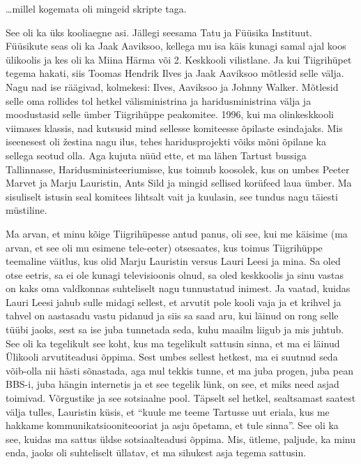 
\ldots millel kogemata oli mingeid skripte taga. 


See oli ka üks kooliaegne asi. Jällegi seesama Tatu ja Füüsika Instituut. Füüsikute seas oli ka Jaak Aaviksoo, kellega mu isa käis kunagi samal ajal koos ülikoolis ja  kes oli ka Miina Härma või 2. Keskkooli vilistlane. Ja kui Tiigrihüpet tegema hakati, siis Toomas Hendrik Ilves ja Jaak Aaviksoo mõtlesid selle välja. Nagu nad ise räägivad, kolmekesi: Ilves, Aaviksoo ja Johnny Walker. Mõtlesid selle oma rollides tol hetkel välisministrina ja haridusministrina välja ja moodustasid selle ümber Tiigrihüppe peakomitee. 1996, kui ma olinkeskkooli viimases klassis, nad kutsusid mind sellesse komiteesse  õpilaste esindajaks. Mis  iseenesest oli žestina nagu  ilus, tehes  haridusprojekti  võiks mõni õpilane ka sellega seotud olla. Aga kujuta nüüd ette, et ma lähen Tartust bussiga Tallinnasse, Haridusministeeriumisse, kus toimub koosolek, kus on umbes Peeter Marvet ja Marju Lauristin, Ants Sild ja mingid sellised korüfeed laua ümber. Ma sisuliselt istusin seal komitees lihtsalt vait ja kuulasin, see tundus nagu täiesti müstiline. 

Ma arvan, et minu kõige Tiigrihüpesse antud panus, oli see, kui me käisime (ma arvan, et see oli mu esimene tele-eeter) otsesaates, kus toimus Tiigrihüppe teemaline väitlus, kus olid Marju Lauristin versus Lauri Leesi ja mina. Sa oled otse eetris, sa ei ole  kunagi televisioonis olnud, sa oled keskkoolis ja sinu vastas on kaks oma valdkonnas suhteliselt nagu tunnustatud inimest. Ja vaatad, kuidas Lauri Leesi jahub sulle midagi sellest, et arvutit pole kooli vaja ja et krihvel ja tahvel on aastasadu vastu pidanud ja siis sa saad aru, kui läinud on rong selle tüübi jaoks, sest sa ise juba tunnetada seda,  kuhu maailm liigub ja mis juhtub. See oli ka tegelikult see koht, kus ma tegelikult sattusin sinna, et ma ei läinud Ülikooli  arvutiteadusi õppima. Sest umbes sellest hetkest, ma ei suutnud seda võib-olla nii hästi sõnastada, aga mul tekkis tunne, et ma juba progen, juba pean BBS-i, juba hängin internetis ja et see tegelik lünk, on see, et miks need asjad toimivad. Võrgustike ja see sotsiaalne pool. Täpselt sel hetkel, sealtsamast saatest välja tulles, Lauristin küsis, et \enquote{kuule me teeme Tartusse uut eriala, kus me hakkame kommunikatsiooniteooriat ja asju õpetama, et tule sinna}. See oli ka see, kuidas ma sattus üldse  sotsiaalteadusi õppima. Mis, ütleme, paljude, ka minu enda, jaoks oli suhteliselt üllatav, et ma sihukest asja tegema sattusin.

